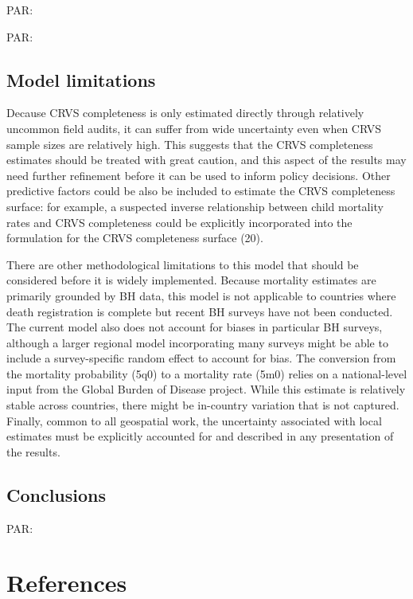 \documentclass[
]{article}
\begin{document}
PAR:

PAR:

\hypertarget{model-limitations}{%
\subsection{Model limitations}\label{model-limitations}}

Decause CRVS completeness is only estimated directly through relatively uncommon field audits, it can suffer from wide uncertainty even when CRVS sample sizes are relatively high. This suggests that the CRVS completeness estimates should be treated with great caution, and this aspect of the results may need further refinement before it can be used to inform policy decisions. Other predictive factors could be also be included to estimate the CRVS completeness surface: for example, a suspected inverse relationship between child mortality rates and CRVS completeness could be explicitly incorporated into the formulation for the CRVS completeness surface (20).

There are other methodological limitations to this model that should be considered before it is widely implemented. Because mortality estimates are primarily grounded by BH data, this model is not applicable to countries where death registration is complete but recent BH surveys have not been conducted. The current model also does not account for biases in particular BH surveys, although a larger regional model incorporating many surveys might be able to include a survey-specific random effect to account for bias. The conversion from the mortality probability (5q0) to a mortality rate (5m0) relies on a national-level input from the Global Burden of Disease project. While this estimate is relatively stable across countries, there might be in-country variation that is not captured. Finally, common to all geospatial work, the uncertainty associated with local estimates must be explicitly accounted for and described in any presentation of the results.

\hypertarget{conclusions}{%
\subsection{Conclusions}\label{conclusions}}

PAR:

\hypertarget{references}{%
\section{References}\label{references}}
\end{document}
